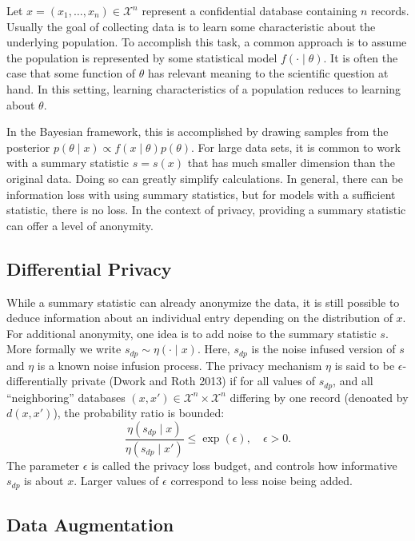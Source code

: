 Let \(x = (x_1, \ldots, x_n) \in \mathcal{X}^n\) represent a confidential
database containing \(n\) records. Usually the goal of collecting data
is to learn some characteristic about the underlying population.
To accomplish this task, a common approach is to assume the population
is represented by some statistical model \(f( \cdot \mid \theta)\). It is often the case that
some function of \(\theta\) has relevant meaning to the scientific question at hand. In this setting,
learning characteristics of a population reduces to learning about \(\theta\).

In the Bayesian framework, this is accomplished by drawing samples from the
posterior \(p(\theta \mid x) \propto f(x \mid \theta) p(\theta)\). For
large data sets, it is common to work with a summary statistic \(s = s(x)\)
that has much smaller dimension than the original data. Doing so can
greatly simplify calculations. In general, there can be information
loss with using summary statistics, but for models with a sufficient
statistic, there is no loss. In the context of privacy, providing
a summary statistic can offer a level of anonymity.

\hypertarget{differential-privacy}{%
\subsection{Differential Privacy}\label{differential-privacy}}

While a summary statistic can already anonymize the data, it is still
possible to deduce information about an individual entry depending on
the distribution of \(x\). For additional anonymity, one idea is to
add noise to the summary statistic \(s\). More formally we write
\(s_{dp} \sim \eta(\cdot \mid x)\). Here, \(s_{dp}\) is the noise infused version of \(s\) and
\(\eta\) is a known noise infusion process. The privacy mechanism
\(\eta\) is said to be \(\epsilon\)-differentially private (Dwork and Roth 2013) if for all values of
\(s_{dp}\), and all ``neighboring'' databases \((x,x') \in \mathcal{X}^n \times \mathcal{X}^n\) differing
by one record (denoated by \(d(x,x')\)), the probability ratio is bounded:
\[
\dfrac{\eta(s_{dp} \mid x)}{\eta(s_{dp} \mid x')} \leq \exp(\epsilon), \quad \epsilon > 0.
\]
The parameter \(\epsilon\) is called the privacy loss budget, and controls how informative \(s_{dp}\)
is about \(x\). Larger values of \(\epsilon\) correspond to less noise being added.

\hypertarget{data-augmentation}{%
\subsection{Data Augmentation}\label{data-augmentation}}

